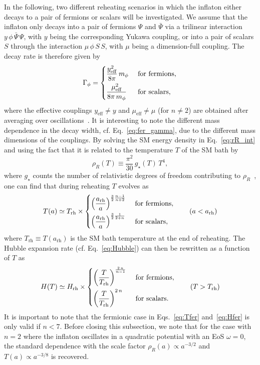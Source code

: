\documentclass[a4paper,11pt]{article}
\newcommand{\rR}{\rho_R}
\newcommand{\Gp}{\Gamma_\phi}
\newcommand{\gs}{g_\star}
\newcommand{\arh}{a_\text{rh}}
\newcommand{\Trh}{T_\text{rh}}
\newcommand{\Hrh}{H_\text{rh}}
\begin{document}
In the following, two different reheating scenarios in which the inflaton either decays to a pair of fermions or scalars will be investigated.
We assume that the inflaton only decays into a pair of fermions $\Psi$ and $\bar\Psi$ via a trilinear interaction $y\, \phi\, \bar\Psi\, \Psi$, with $y$ being the corresponding Yukawa coupling, or into a pair of scalars $S$ through the interaction $\mu\, \phi\, S\, S$, with $\mu$ being a dimension-full coupling.
The decay rate is therefore given by
\begin{equation} \label{eq:fer_gamma}
    \Gp =
    \begin{dcases}
        \frac{y_{\text{eff}}^2}{8\pi}\, m_\phi &\text{ for fermions,}\\
        \frac{\mu_{\text{eff}}^2}{8\pi\, m_\phi} &\text{ for scalars,}
    \end{dcases}
\end{equation}
where the effective couplings $y_\text{eff} \ne y$ and $\mu_\text{eff} \ne \mu$ (for $n \neq 2$) are obtained after averaging over oscillations~\cite{Shtanov:1994ce, Garcia:2020wiy, Ichikawa:2008ne}.
It is interesting to note the different mass dependence in the decay width, cf. Eq.~\eqref{eq:fer_gamma}, due to the different mass dimensions of the couplings.
By solving the SM energy density in Eq.~\eqref{eq:rR_int} and using the fact that it is related to the temperature $T$ of the SM bath by
\begin{equation}
    \rR(T) \equiv \frac{\pi^2}{30}\, \gs(T)\, T^4,
\end{equation}
where $\gs$ counts the number of relativistic degrees of freedom contributing to $\rR$~\cite{Drees:2015exa}, one can find that during reheating $T$ evolves as
\begin{equation} \label{eq:Tfer}
    T(a) \simeq \Trh \times
    \begin{dcases}
        \left(\frac{\arh}{a}\right)^{\frac32 \frac{n - 1}{n + 2}} &\text{ for fermions},\\
        \left(\frac{\arh}{a}\right)^{\frac32 \frac{1}{2 + n}} &\text{ for scalars},
    \end{dcases}
    \qquad(a<\arh)
\end{equation}
where $\Trh \equiv T(\arh)$ is the SM bath temperature at the end of reheating.
The Hubble expansion rate (cf. Eq.~\eqref{eq:Hubble}) can then be rewritten as a function of $T$ as
\begin{equation} \label{eq:Hfer}
    H(T) \simeq \Hrh \times
    \begin{dcases}
        \left(\frac{T}{\Trh}\right)^\frac{2\, n}{n - 1} &\text{ for fermions},\\
        \left(\frac{T}{\Trh}\right)^{2\, n} &\text{ for scalars}.
    \end{dcases}
    \qquad(T>\Trh)
\end{equation}
It is important to note that the fermionic case in Eqs.~\eqref{eq:Tfer} and~\eqref{eq:Hfer} is only valid if $n < 7$.
Before closing this subsection, we note that for the case with $n = 2$ where the inflaton oscillates in a quadratic potential with an EoS $\omega = 0$, the standard dependence with the scale factor $\rR(a) \propto a^{-3/2}$ and $T(a) \propto a^{-3/8}$ is recovered.\\
\end{document}
